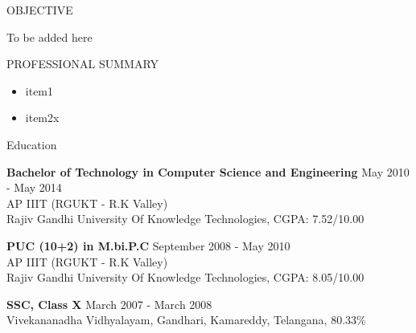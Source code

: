 \documentclass{resume} %
\begin{document}

\begin{rSection}{OBJECTIVE}
  
  { To be added here }


\end{rSection}





\begin{rSection}{PROFESSIONAL SUMMARY}
  
  \begin{itemize}
  \item item1
  \item item2x
  \end{itemize}
\end{rSection}



\begin{rSection}{Education}

  {\bf Bachelor of Technology in Computer Science and Engineering} \hfill {May 2010 - May 2014}
  \\ 
  AP IIIT (RGUKT - R.K Valley)
  \\
  Rajiv Gandhi University Of Knowledge Technologies,  CGPA: 7.52/10.00  
  
  {\bf PUC (10+2) in M.bi.P.C} \hfill {September 2008 - May 2010}
  \\
  AP IIIT (RGUKT - R.K Valley)
  \\
  Rajiv Gandhi University Of Knowledge Technologies,  CGPA: 8.05/10.00  
  
  {\textbf{SSC, Class X}}  \hfill March 2007 - March  2008\\
  Vivekananadha Vidhyalayam, Gandhari, Kamareddy, Telangana, 80.33\% 

\end{rSection}

\end{document}
